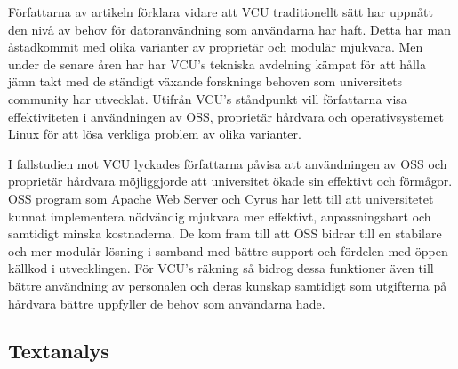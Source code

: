 \documentclass[a4paper]{article}
\begin{document}
Författarna av artikeln förklara vidare att VCU traditionellt sätt har uppnått den nivå av behov för datoranvändning som användarna har haft. Detta har man åstadkommit med olika varianter av proprietär och modulär mjukvara. Men under de senare åren har har VCU’s tekniska avdelning kämpat för att hålla jämn takt med de ständigt växande forsknings behoven som universitets community har utvecklat. Utifrån VCU’s ståndpunkt vill författarna visa effektiviteten i användningen av  OSS, proprietär hårdvara och operativsystemet Linux för att lösa verkliga problem av olika varianter.

I fallstudien mot VCU lyckades författarna påvisa att användningen av OSS och proprietär hårdvara möjliggjorde att universitet ökade sin effektivt och förmågor. OSS program som Apache Web Server och Cyrus har lett till att universitetet kunnat implementera nödvändig mjukvara mer effektivt, anpassningsbart och samtidigt minska kostnaderna. De kom fram till att OSS bidrar till en stabilare och mer modulär lösning i samband med bättre support och fördelen med öppen källkod i utvecklingen. För VCU’s räkning så bidrog dessa funktioner även till bättre användning av personalen och deras kunskap samtidigt som utgifterna på hårdvara bättre uppfyller de behov som användarna hade.


\subsection{Textanalys}
\end{document}
